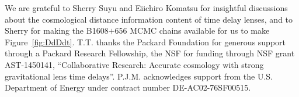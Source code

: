 %
%


\begin{acknowledgements}
We are grateful to Sherry Suyu and Eiichiro Komatsu for insightful
discussions about the cosmological distance information content
of time delay lenses, and to Sherry for making the B1608$+$656 MCMC
chains available for us to make Figure~\ref{fig:DdDdt}.
%
T.T. thanks the Packard Foundation for generous support through a
Packard Research Fellowship, the NSF for funding through NSF grant
AST-1450141, ``Collaborative Research: Accurate cosmology with strong
gravitational lens time delays''.
%
P.J.M. acknowledges support from the U.S.
Department of Energy under contract number DE-AC02-76SF00515.
\end{acknowledgements}



